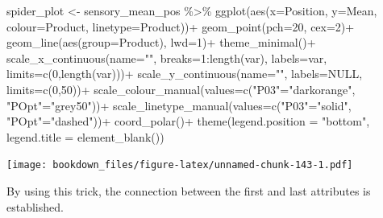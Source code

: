 \documentclass[
]{krantz}
\makeatletter
\newenvironment{Shaded}{\begin{snugshade}}{\end{snugshade}}
\newcommand{\AttributeTok}[1]{\textcolor[rgb]{0.61,0.61,0.61}{#1}}
\newcommand{\ConstantTok}[1]{\textcolor[rgb]{0,0,0}{#1}}
\newcommand{\DecValTok}[1]{\textcolor[rgb]{0.06,0.06,0.06}{#1}}
\newcommand{\FunctionTok}[1]{\textcolor[rgb]{0,0,0}{#1}}
\newcommand{\NormalTok}[1]{#1}
\newcommand{\OtherTok}[1]{\textcolor[rgb]{0.37,0.37,0.37}{#1}}
\newcommand{\SpecialCharTok}[1]{\textcolor[rgb]{0,0,0}{#1}}
\newcommand{\StringTok}[1]{\textcolor[rgb]{0.5,0.5,0.5}{#1}}
\newenvironment{kframe}{%
\medskip{}
\setlength{\fboxsep}{.8em}
 \def\at@end@of@kframe{}%
 \ifinner\ifhmode%
  \def\at@end@of@kframe{\end{minipage}}%
  \begin{minipage}{\columnwidth}%
 \fi\fi%
 \def\FrameCommand##1{\hskip\@totalleftmargin \hskip-\fboxsep
 \colorbox{shadecolor}{##1}\hskip-\fboxsep
     \hskip-\linewidth \hskip-\@totalleftmargin \hskip\columnwidth}%
 \MakeFramed {\advance\hsize-\width
   \@totalleftmargin\z@ \linewidth\hsize
   \@setminipage}}%
 {\par\unskip\endMakeFramed%
 \at@end@of@kframe}
\renewenvironment{Shaded}{\begin{kframe}}{\end{kframe}}
\makeatother
\begin{document}
\begin{Shaded}
\begin{Highlighting}[]
\NormalTok{spider\_plot }\OtherTok{\textless{}{-}}\NormalTok{ sensory\_mean\_pos }\SpecialCharTok{\%\textgreater{}\%} 
  \FunctionTok{ggplot}\NormalTok{(}\FunctionTok{aes}\NormalTok{(}\AttributeTok{x=}\NormalTok{Position, }\AttributeTok{y=}\NormalTok{Mean, }\AttributeTok{colour=}\NormalTok{Product, }\AttributeTok{linetype=}\NormalTok{Product))}\SpecialCharTok{+}
  \FunctionTok{geom\_point}\NormalTok{(}\AttributeTok{pch=}\DecValTok{20}\NormalTok{, }\AttributeTok{cex=}\DecValTok{2}\NormalTok{)}\SpecialCharTok{+}
  \FunctionTok{geom\_line}\NormalTok{(}\FunctionTok{aes}\NormalTok{(}\AttributeTok{group=}\NormalTok{Product), }\AttributeTok{lwd=}\DecValTok{1}\NormalTok{)}\SpecialCharTok{+}
  \FunctionTok{theme\_minimal}\NormalTok{()}\SpecialCharTok{+}
  \FunctionTok{scale\_x\_continuous}\NormalTok{(}\AttributeTok{name=}\StringTok{""}\NormalTok{, }\AttributeTok{breaks=}\DecValTok{1}\SpecialCharTok{:}\FunctionTok{length}\NormalTok{(var), }
                     \AttributeTok{labels=}\NormalTok{var, }\AttributeTok{limits=}\FunctionTok{c}\NormalTok{(}\DecValTok{0}\NormalTok{,}\FunctionTok{length}\NormalTok{(var)))}\SpecialCharTok{+}
  \FunctionTok{scale\_y\_continuous}\NormalTok{(}\AttributeTok{name=}\StringTok{""}\NormalTok{, }\AttributeTok{labels=}\ConstantTok{NULL}\NormalTok{, }\AttributeTok{limits=}\FunctionTok{c}\NormalTok{(}\DecValTok{0}\NormalTok{,}\DecValTok{50}\NormalTok{))}\SpecialCharTok{+}
  \FunctionTok{scale\_colour\_manual}\NormalTok{(}\AttributeTok{values=}\FunctionTok{c}\NormalTok{(}\StringTok{"P03"}\OtherTok{=}\StringTok{"darkorange"}\NormalTok{, }\StringTok{"POpt"}\OtherTok{=}\StringTok{"grey50"}\NormalTok{))}\SpecialCharTok{+}
  \FunctionTok{scale\_linetype\_manual}\NormalTok{(}\AttributeTok{values=}\FunctionTok{c}\NormalTok{(}\StringTok{"P03"}\OtherTok{=}\StringTok{"solid"}\NormalTok{, }\StringTok{"POpt"}\OtherTok{=}\StringTok{"dashed"}\NormalTok{))}\SpecialCharTok{+}
  \FunctionTok{coord\_polar}\NormalTok{()}\SpecialCharTok{+}
  \FunctionTok{theme}\NormalTok{(}\AttributeTok{legend.position =} \StringTok{"bottom"}\NormalTok{, }\AttributeTok{legend.title =} \FunctionTok{element\_blank}\NormalTok{())}
\end{Highlighting}
\end{Shaded}

\texttt{[image: bookdown\_files/figure-latex/unnamed-chunk-143-1.pdf]}

By using this trick, the connection between the first and last attributes is established.
\end{document}
